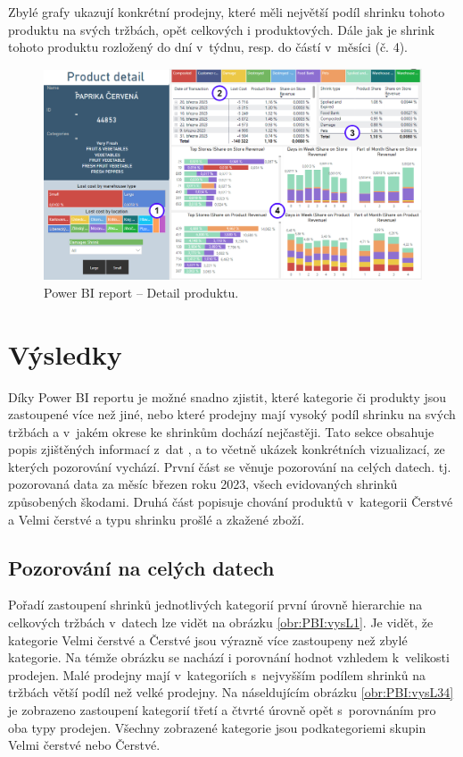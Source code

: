 Zbylé grafy ukazují konkrétní prodejny, které měli největší podíl shrinku tohoto produktu na svých tržbách, opět celkových i produktových. Dále jak je shrink tohoto produktu rozložený do dní v~týdnu, resp. do částí v~měsíci (č. 4).

\begin{figure}[h!]
    \centering
    \captionsetup{justification=centering}
    \includegraphics[width=\textwidth]{obrazky/PBI/productdetail.png}
    \caption{Power BI report -- Detail produktu.}
    \label{obr:PBI:detail}
\end{figure}

\section{Výsledky}
\label{sec:vizualizace:vysl}

Díky Power BI reportu je možné snadno zjistit, které kategorie či produkty jsou zastoupené více než jiné, nebo které prodejny mají vysoký podíl shrinku na svých tržbách a v~jakém okrese ke shrinkům dochází nejčastěji. Tato sekce obsahuje popis zjištěných informací z~dat , a to včetně ukázek konkrétních vizualizací, ze kterých pozorování vychází.
První část se věnuje pozorování na celých datech. tj. pozorovaná data za měsíc březen roku 2023, všech evidovaných shrinků způsobených škodami. Druhá část popisuje chování produktů v~kategorii Čerstvé a Velmi čerstvé a typu shrinku prošlé a zkažené zboží.

\subsection*{Pozorování na celých datech}

Pořadí zastoupení shrinků jednotlivých kategorií první úrovně hierarchie na celkových tržbách v~datech lze vidět na obrázku \ref*{obr:PBI:vysL1}. Je vidět, že kategorie Velmi čerstvé a Čerstvé jsou výrazně více zastoupeny než zbylé kategorie. Na témže obrázku se nachází i porovnání hodnot vzhledem k~velikosti prodejen. 
Malé prodejny mají v~kategoriích s~nejvyšším podílem shrinků na tržbách větší podíl než velké prodejny.
Na náseldujícím obrázku \ref*{obr:PBI:vysL34} je zobrazeno zastoupení kategorií třetí a čtvrté úrovně opět s~porovnáním pro oba typy prodejen. Všechny zobrazené kategorie jsou podkategoriemi skupin Velmi čerstvé nebo Čerstvé.

